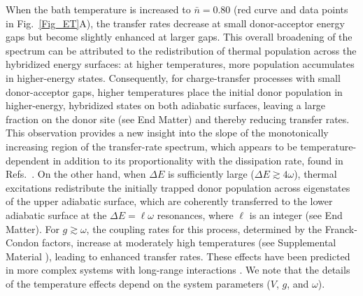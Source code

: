 \documentclass[%
reprint,
superscriptaddress,
amsmath,amssymb,
aps,
prl,
floatfix,
]{revtex4-2}
\begin{document}
When the bath temperature is increased to $\bar{n}=0.80$ (red curve and data points in Fig.~\ref{Fig_ET}A), the transfer rates decrease at small donor-acceptor energy gaps but become slightly enhanced at larger gaps. This overall broadening of the spectrum can be attributed to the redistribution of thermal population across the hybridized energy surfaces: at higher temperatures, more population accumulates in higher-energy states. Consequently, for charge-transfer processes with small donor-acceptor gaps, higher temperatures place the initial donor population in higher-energy, hybridized states on both adiabatic surfaces, leaving a large fraction on the donor site (see End Matter) and thereby reducing transfer rates. This observation provides a new insight into the slope of the monotonically increasing region of the transfer-rate spectrum, which appears to be temperature-dependent in addition to its proportionality with the dissipation rate, found in Refs.~\cite{schlawin2021electrontransfer,so2024electrontransfer}. On the other hand, when $\Delta E$ is sufficiently large ($\Delta E\gtrsim4\omega$), thermal excitations redistribute the initially trapped donor population across eigenstates of the upper adiabatic surface, which are coherently transferred to the lower adiabatic surface at the $\Delta E=\ell\omega$ resonances, where $\ell$ is an integer (see End Matter). For $g\gtrsim\omega$, the coupling rates for this process, determined by the Franck-Condon factors, increase at moderately high temperatures (see Supplemental Material \cite{so2025fT_supp}), leading to enhanced transfer rates. These effects have been predicted in more complex systems with long-range interactions \cite{padilla2025delocalizedexcitationtransferopen}. We note that the details of the temperature effects depend on the system parameters ($V$, $g$, and $\omega$). 
\end{document}
